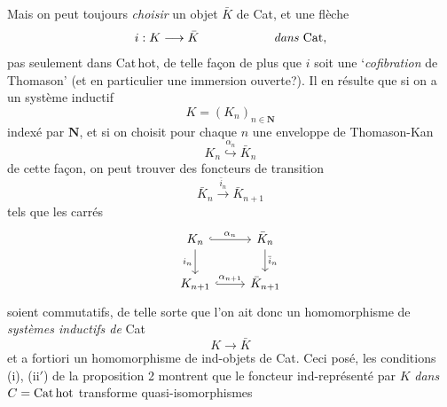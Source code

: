 \noindent{}%
Mais on peut toujours \textit{choisir} un objet $\bar{K}$ de Cat, et une flèche
\[
i : K \longrightarrow \bar{K} \qquad\qquad\qquad \textit{dans } \mathrm{Cat},
\]
pas seulement dans Cat\,hot, de telle façon de plus que $i$ soit une `\textit{cofibration} de Thomason' (et en particulier une immersion ouverte?). Il en résulte que si on a un système inductif
\[
K = (K_n)_{n\in\mathbf{N}}
\]
indexé par $\mathbf{N}$, et si on choisit pour chaque $n$ une enveloppe de Thomason-Kan
\[
K_n \overset{\alpha_n}{\hookrightarrow} \bar{K}_n
\]
de cette façon, on peut trouver des foncteurs de transition
\[
\bar{K}_n \xrightarrow{\bar{i}_n} \bar{K}_{n+1}
\]
tels que les carrés
\[
\begin{tikzcd}
K_n \arrow[r,hook,"\alpha_n"] \arrow[d,"i_n"'] & \bar{K}_n \arrow[d,"\bar{i}_n"] \\
K_{n+1} \arrow[r,hook,"\alpha_{n+1}"] & \bar{K}_{n+1}
\end{tikzcd}
\]
soient commutatifs, de telle sorte que l'on ait donc un homomorphisme de \textit{systèmes inductifs de} Cat
\[
K \longrightarrow \bar{K}
\]
et a fortiori un homomorphisme de ind-objets de Cat. Ceci posé, les conditions (i), (ii$'$) de la proposition 2 montrent que le foncteur ind-représenté par $K$ \textit{dans} $C = \mathrm{Cat\,hot}$ transforme quasi-isomorphismes

